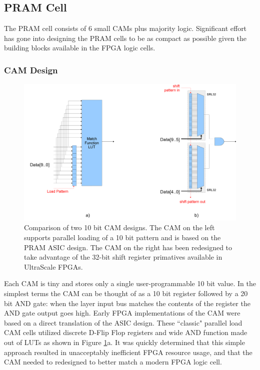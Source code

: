 \documentclass[letterpaper]{article}
\begin{document}
\subsection{PRAM Cell}

The PRAM cell consists of 6 small CAMs plus majority logic. Significant effort has gone into designing the PRAM cells to be as compact as possible given the building blocks available in the FPGA logic cells.

\subsubsection{CAM Design}

\begin{figure}
\centering
\includegraphics[width=14cm]{cam.png}
\caption[Two CAM Designs]{Comparison of two 10 bit CAM designs. The CAM on the left supports parallel loading of a 10 bit pattern and is based on the PRAM ASIC design. The CAM on the right has been redesigned to take advantage of the 32-bit shift register primatives available in UltraScale FPGAs.}
\label{camfigs}
\end{figure}

Each CAM is tiny and stores only a single user-programmable 10 bit value. In the simplest terms the CAM can be thought of as a 10 bit register followed by a 20 bit AND gate: when the layer input bus matches the contents of the register the AND gate output goes high. Early FPGA implementations of the CAM were based on a direct translation of the ASIC design. These ``classic" parallel load CAM cells utilized discrete D-Flip Flop registers and wide AND function made out of LUTs as shown in Figure \ref{camfigs}a. It was quickly determined that this simple approach resulted in unacceptably inefficient FPGA resource usage, and that the CAM needed to redesigned to better match a modern FPGA logic cell.
\end{document}
